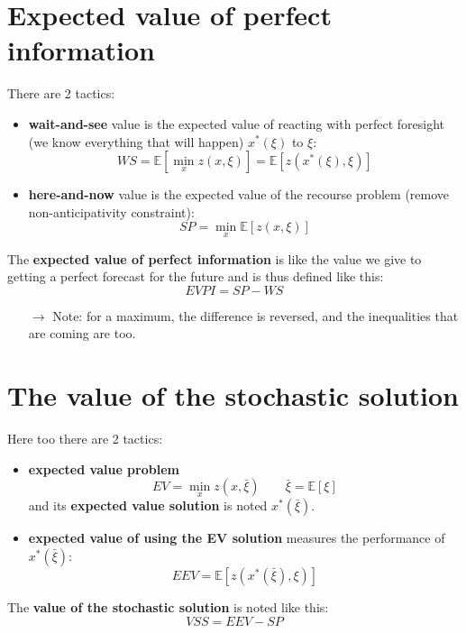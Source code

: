 \documentclass[12pt, openany]{report}
\newcommand{\E}{\mathbb{E}}
\theoremstyle{definition}
\begin{document}
\section{Expected value of perfect information}
There are 2 tactics:
\begin{itemize}
	\item \textbf{wait-and-see} value is the expected value of reacting with perfect foresight (we know everything that will happen) $x^*(\xi)$ to $\xi$: 
	\begin{equation}
		WS = \E[\displaystyle \min_x z(x,\xi)] = \E[z(x^*(\xi),\xi)]
	\end{equation}
	\item \textbf{here-and-now} value is the expected value of the recourse problem (remove non-anticipativity constraint):
	\begin{equation}
		SP = \displaystyle \min_x \E[z(x,\xi)]
	\end{equation}
\end{itemize}
The \textbf{expected value of perfect information} is like the value we give to getting a perfect forecast for the future and is thus defined like this:
\begin{equation}
	EVPI = SP - WS
\end{equation}
\begin{itemize}
	\item [$\to$] Note: for a maximum, the difference is reversed, and the inequalities that are coming are too.
\end{itemize}
\section{The value of the stochastic solution}
Here too there are 2 tactics:
\begin{itemize}
	\item \textbf{expected value problem}
	\begin{equation}
		EV = \displaystyle \min_x z(x,\bar{\xi}) \qquad \bar \xi = \E[\xi]
	\end{equation}
	and its \textbf{expected value solution} is noted $x^*(\bar{\xi})$.
	\item \textbf{expected value of using the EV solution} measures the performance of $x^*(\bar{\xi})$:
	\begin{equation}
		EEV = \E[z(x^*(\bar{\xi}),\xi)]
	\end{equation}
\end{itemize}
The \textbf{value of the stochastic solution} is noted like this:
\begin{equation}
	VSS = EEV - SP
\end{equation}
\end{document}
